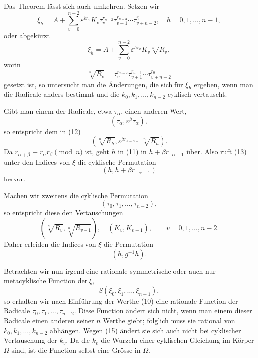 \documentclass[11pt]{article}
\begin{document}
Das Theorem l\"asst sich auch umkehren. Setzen wir
\begin{equation}\tag{10}
  \xi_h=A+
  \sum_{v=0}^{n-2}\varepsilon^{hr_v}K_v\tau_v^{r_{n-2}}\tau_{v+1}^{r_{n-3}}\cdots\tau_{v+n-2}^{r_0},
  \quad h=0,1,\ldots,n-1,
\end{equation}
oder abgek\"urzt
\begin{equation}\tag{11}
  \xi_h=A+
  \sum_{v=0}^{n-2}\varepsilon^{hr_v}K_v\sqrt[n]{R_v},
\end{equation}
worin
\begin{equation}\tag{12}
  \sqrt[n]{R_v}=\tau_v^{r_{n-2}}\tau_{v+1}^{r_{n-3}}\cdots\tau_{v+n-2}^{r_0}
\end{equation}
gesetzt ist, so untersucht man die \"Anderungen, die sich f\"ur $\xi_h$ ergeben, wenn man die Radicale anders bestimmt und die $k_0,k_1,\ldots,k_{n-2}$ cyklisch vertauscht.

Gibt man einem der Radicale, etwa $\tau_\alpha$, einen anderen Wert,
\begin{equation}\tag{13}
  (\tau_\alpha,\varepsilon^\beta\tau_\alpha),
\end{equation}
so entspricht dem in (12)
\begin{equation}\tag{14}
  (\sqrt[n]{R_h},\varepsilon^{\beta r_{h-\alpha-1}}\sqrt[n]{R_h}).
\end{equation}
Da $r_{\alpha+\beta}\equiv r_\alpha r_\beta\pmod n$ ist, geht $h$ in (11) in $h+\beta r_{-\alpha-1}$ \"uber. Also ruft (13) unter den Indices von $\xi$ die cyklische Permutation
\[
  (h,h+\beta r_{-\alpha-1})
\]
hervor.

Machen wir zweitens die cyklische Permutation
\begin{equation}\tag{15}
  (\tau_0,\tau_1,\ldots,\tau_{n-2}),
\end{equation}
so entspricht diese den Vertauschungen
\begin{equation}\tag{16}
  (\sqrt[n]{R_v},\sqrt[n]{R_{v+1}}),\quad (K_v,K_{v+1}),\qquad
  v=0,1,\ldots,n-2.
\end{equation}
Daher erleiden die Indices von $\xi$ die Permutation
\[
  (h,g^{-1}h).
\]

Betrachten wir nun irgend eine rationale symmetrische oder auch nur metacyklische Function der $\xi$,
\[
  S(\xi_0,\xi_1,\ldots,\xi_{n-1}),
\]
so erhalten wir nach Einf\"uhrung der Werthe (10) eine rationale Function der Radicale $\tau_0,\tau_1,\ldots,\tau_{n-2}$. Diese Function \"andert sich nicht, wenn man einem dieser Radicale einen anderen seiner $n$ Werthe giebt; folglich muss sie rational von $k_0,k_1,\ldots,k_{n-2}$ abh\"angen. Wegen (15) \"andert sie sich auch nicht bei cyklischer Vertauschung der $k_v$. Da die $k_v$ die Wurzeln einer cyklischen Gleichung im K\"orper $\Omega$ sind, ist die Function selbst eine Gr\"osse in $\Omega$.
\end{document}
